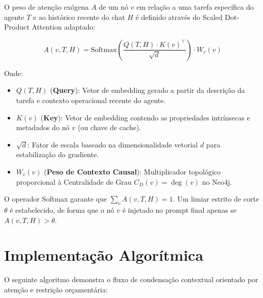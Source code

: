\documentclass[11pt,a4paper]{article}
\begin{document}
O peso de atenção exógena $A$ de um nó $v$ em relação a uma tarefa específica do agente $T$ e ao
histórico recente do chat $H$ é definido através do Scaled Dot-Product Attention adaptado:

\begin{equation}
A(v, T, H) = \mathrm{Softmax}\!\left( \frac{Q(T,H) \cdot K(v)^{\top}}{\sqrt{d}} \right) \cdot W_c(v)
\end{equation}

Onde:
\begin{itemize}
    \item $Q(T, H)$ (\textbf{Query}): Vetor de embedding gerado a partir da descrição da tarefa
          e contexto operacional recente do agente.
    \item $K(v)$ (\textbf{Key}): Vetor de embedding contendo as propriedades intrínsecas e
          metadados do nó $v$ (ou chave de cache).
    \item $\sqrt{d}$: Fator de escala baseado na dimensionalidade vetorial $d$ para estabilização
          do gradiente.
    \item $W_c(v)$ (\textbf{Peso de Contexto Causal}): Multiplicador topológico proporcional à
          Centralidade de Grau $C_D(v) = \deg(v)$ no Neo4j.
\end{itemize}

O operador Softmax garante que $\sum_v A(v, T, H) = 1$. Um limiar estrito de corte $\theta$ é
estabelecido, de forma que o nó $v$ é injetado no prompt final apenas se $A(v, T, H) > \theta$.


\section{Implementação Algorítmica}

O seguinte algoritmo demonstra o fluxo de condensação contextual orientado por atenção e
restrição orçamentária:
\end{document}
